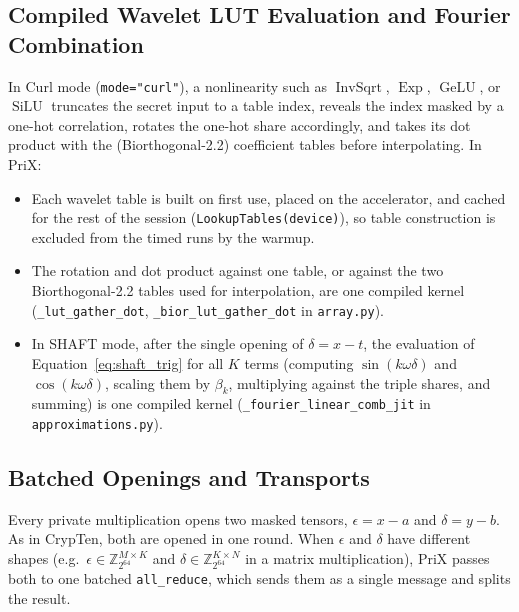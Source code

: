 \documentclass[11pt]{article}
\newcommand{\Zring}{\mathbb{Z}_{2^{64}}}
\begin{document}
\subsection{Compiled Wavelet LUT Evaluation and Fourier Combination}
\label{sec:lut_shaft_fusion}
In Curl mode (\texttt{mode="curl"}), a nonlinearity such as $\operatorname{InvSqrt}$, $\operatorname{Exp}$, $\operatorname{GeLU}$, or $\operatorname{SiLU}$ truncates the secret input to a table index, reveals the index masked by a one-hot correlation, rotates the one-hot share accordingly, and takes its dot product with the (Biorthogonal-2.2) coefficient tables before interpolating. In PriX:
\begin{itemize}
    \item Each wavelet table is built on first use, placed on the accelerator, and cached for the rest of the session (\texttt{LookupTables(device)}), so table construction is excluded from the timed runs by the warmup.
    \item The rotation and dot product against one table, or against the two Biorthogonal-2.2 tables used for interpolation, are one compiled kernel (\texttt{\_lut\_gather\_dot}, \texttt{\_bior\_lut\_gather\_dot} in \texttt{array.py}).
    \item In SHAFT mode, after the single opening of $\delta = x - t$, the evaluation of Equation~\ref{eq:shaft_trig} for all $K$ terms (computing $\sin(k\omega\delta)$ and $\cos(k\omega\delta)$, scaling them by $\beta_k$, multiplying against the triple shares, and summing) is one compiled kernel (\texttt{\_fourier\_linear\_comb\_jit} in \texttt{approximations.py}).
\end{itemize}

\subsection{Batched Openings and Transports}
\label{sec:collectives}
Every private multiplication opens two masked tensors, $\epsilon = x - a$ and $\delta = y - b$. As in CrypTen, both are opened in one round. When $\epsilon$ and $\delta$ have different shapes (e.g.\ $\epsilon \in \Zring^{M \times K}$ and $\delta \in \Zring^{K \times N}$ in a matrix multiplication), PriX passes both to one batched \texttt{all\_reduce}, which sends them as a single message and splits the result.
\end{document}
